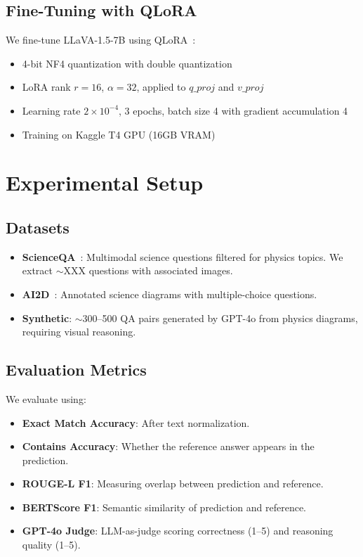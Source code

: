 \documentclass[conference]{IEEEtran}
\begin{document}
\subsection{Fine-Tuning with QLoRA}

We fine-tune LLaVA-1.5-7B using QLoRA~\cite{dettmers2023qlora}:
\begin{itemize}
    \item 4-bit NF4 quantization with double quantization
    \item LoRA rank $r=16$, $\alpha=32$, applied to $q\_proj$ and $v\_proj$
    \item Learning rate $2 \times 10^{-4}$, 3 epochs, batch size 4 with gradient accumulation 4
    \item Training on Kaggle T4 GPU (16GB VRAM)
\end{itemize}

\section{Experimental Setup}
\label{sec:experiments}

\subsection{Datasets}

\begin{itemize}
    \item \textbf{ScienceQA}~\cite{lu2022scienceqa}: Multimodal science questions filtered for physics topics. We extract $\sim$XXX questions with associated images.
    \item \textbf{AI2D}~\cite{kembhavi2016ai2d}: Annotated science diagrams with multiple-choice questions.
    \item \textbf{Synthetic}: $\sim$300--500 QA pairs generated by GPT-4o from physics diagrams, requiring visual reasoning.
\end{itemize}

\subsection{Evaluation Metrics}

We evaluate using:
\begin{itemize}
    \item \textbf{Exact Match Accuracy}: After text normalization.
    \item \textbf{Contains Accuracy}: Whether the reference answer appears in the prediction.
    \item \textbf{ROUGE-L F1}: Measuring overlap between prediction and reference.
    \item \textbf{BERTScore F1}: Semantic similarity of prediction and reference.
    \item \textbf{GPT-4o Judge}: LLM-as-judge scoring correctness (1--5) and reasoning quality (1--5).
\end{itemize}
\end{document}
